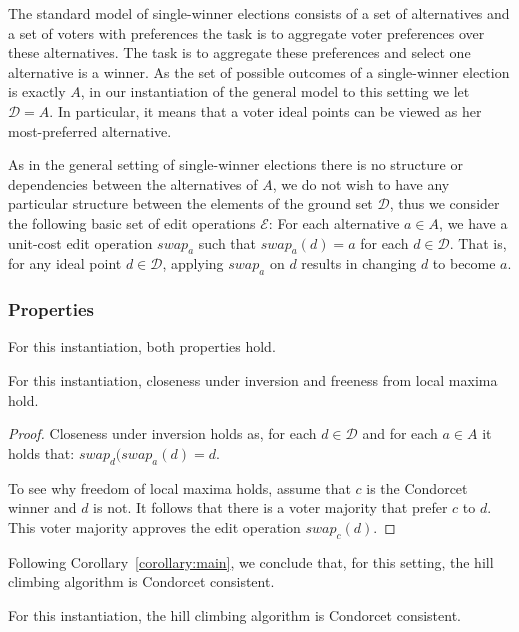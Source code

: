 \documentclass[sigconf]{aamas}  %
\newcommand{\calD}{\mathcal{D}}
\newcommand{\calE}{\mathcal{E}}
\begin{document}
The standard model of single-winner elections consists of a set of alternatives and a set of voters with preferences the task is to aggregate voter preferences over these alternatives.
The task is to aggregate these preferences and select one alternative is a winner.
As the set of possible outcomes of a single-winner election is exactly $A$, in our instantiation of the general model to this setting we let $\calD = A$.
In particular, it means that a voter ideal points can be viewed as her most-preferred alternative.

As in the general setting of single-winner elections there is no structure or dependencies between the alternatives of $A$,
we do not wish to have any particular structure between the elements of the ground set $\calD$,
thus we consider the following basic set of edit operations $\calE$:
  For each alternative $a \in A$, we have a unit-cost edit operation $swap_a$ such that
  $swap_a(d) = a$ for each $d \in \calD$.
That is, for any ideal point $d \in \calD$, applying $swap_a$ on $d$ results in changing $d$ to become $a$.


\subsubsection{Properties}

For this instantiation, both properties hold.

\begin{lemma}
  For this instantiation, closeness under inversion and freeness from local maxima hold.
\end{lemma}

\begin{proof}
%
Closeness under inversion holds as, for each $d \in \calD$ and for each $a \in A$ it holds that:
  $swap_d(swap_a(d) = d$.

To see why freedom of local maxima holds, assume that $c$ is the Condorcet winner and $d$ is not.
It follows that there is a voter majority that prefer $c$ to $d$. This voter majority approves the edit operation $swap_c(d)$.
%
\end{proof}

Following Corollary~\ref{corollary:main}, we conclude that, for this setting, the hill climbing algorithm is Condorcet consistent.

\begin{corollary}
  For this instantiation, the hill climbing algorithm is Condorcet consistent.
\end{corollary}
\end{document}
